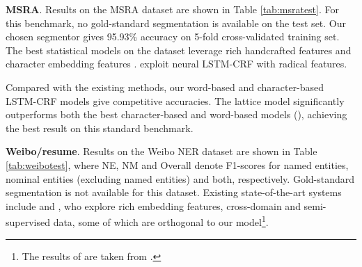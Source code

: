 \documentclass[11pt,a4paper]{article}
\begin{document}
\begin{CJK*}{UTF8}{gbsn}
\begin{table}[!t]
\centering
{}
\caption{Weibo NER results.}
\label{tab:weibotest}
\end{table}


\textbf{MSRA}. Results on the MSRA dataset are shown in Table \ref{tab:msratest}. For this benchmark, no gold-standard segmentation is available on the test set. Our chosen segmentor gives 95.93\% accuracy on 5-fold cross-validated training set. The best statistical models on the dataset leverage rich handcrafted features \cite{chen2006chinese,zhang2006word,zhou2013chinese} and character embedding features \cite{lu2016multi}. \citet{dong2016character} exploit neural LSTM-CRF with radical features. 

Compared with the existing methods, our word-based and character-based LSTM-CRF models give competitive accuracies. The lattice model significantly outperforms both the best character-based and word-based models (), achieving the best result on this standard benchmark.


\textbf{Weibo/resume}. Results on the Weibo NER dataset are shown in Table \ref{tab:weibotest}, where NE, NM and Overall denote F1-scores for named entities, nominal entities (excluding named entities) and both, respectively. Gold-standard segmentation is not available for this dataset. Existing state-of-the-art systems include \citet{peng2016improving} and \citet{he2017unified}, who explore rich embedding features, cross-domain and semi-supervised data, some of which are orthogonal to our model\footnote{The results of \citet{peng2015named,peng2016improving} are taken from \citet{peng2017supplementary}.}.


\end{CJK*}
\end{document}
